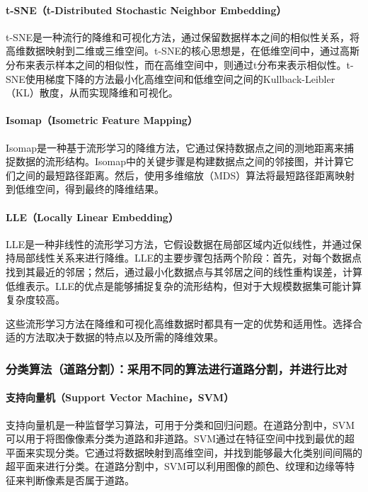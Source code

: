 \documentclass[12pt,hyperref,a4paper,UTF8]{ctexart}
\begin{document}
\paragraph{t-SNE（t-Distributed Stochastic Neighbor Embedding）}
t-SNE是一种流行的降维和可视化方法，通过保留数据样本之间的相似性关系，将高维数据映射到二维或三维空间。t-SNE的核心思想是，在低维空间中，通过高斯分布来表示样本之间的相似性，而在高维空间中，则通过t分布来表示相似性。t-SNE使用梯度下降的方法最小化高维空间和低维空间之间的Kullback-Leibler（KL）散度，从而实现降维和可视化。

\paragraph{Isomap（Isometric Feature Mapping）}
Isomap是一种基于流形学习的降维方法，它通过保持数据点之间的测地距离来捕捉数据的流形结构。Isomap中的关键步骤是构建数据点之间的邻接图，并计算它们之间的最短路径距离。然后，使用多维缩放（MDS）算法将最短路径距离映射到低维空间，得到最终的降维结果。

\paragraph{LLE（Locally Linear Embedding）}
LLE是一种非线性的流形学习方法，它假设数据在局部区域内近似线性，并通过保持局部线性关系来进行降维。LLE的主要步骤包括两个阶段：首先，对每个数据点找到其最近的邻居；然后，通过最小化数据点与其邻居之间的线性重构误差，计算低维表示。LLE的优点是能够捕捉复杂的流形结构，但对于大规模数据集可能计算复杂度较高。

\par
这些流形学习方法在降维和可视化高维数据时都具有一定的优势和适用性。选择合适的方法取决于数据的特点以及所需的降维效果。


\subsubsection{分类算法（道路分割）：采用不同的算法进行道路分割，并进行比对}
\paragraph{支持向量机（Support Vector Machine，SVM）}
支持向量机是一种监督学习算法，可用于分类和回归问题。在道路分割中，SVM可以用于将图像像素分类为道路和非道路。SVM通过在特征空间中找到最优的超平面来实现分类。它通过将数据映射到高维空间，并找到能够最大化类别间间隔的超平面来进行分类。在道路分割中，SVM可以利用图像的颜色、纹理和边缘等特征来判断像素是否属于道路。
\end{document}

